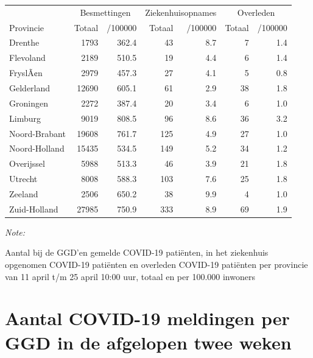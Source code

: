 \documentclass[
  english,
  man,floatsintext]{apa6}
\begin{document}
\begin{table}
\centering
\begin{threeparttable}
\begin{tabular}{lrrrrrr}
\toprule
\multicolumn{1}{c}{ } & \multicolumn{2}{c}{Besmettingen} & \multicolumn{2}{c}{Ziekenhuisopnames} & \multicolumn{2}{c}{Overleden} \\
\cmidrule(l{3pt}r{3pt}){2-3} \cmidrule(l{3pt}r{3pt}){4-5} \cmidrule(l{3pt}r{3pt}){6-7}
Provincie & Totaal & /100000 & Totaal & /100000 & Totaal & /100000\\
\midrule
Drenthe & 1793 & 362.4 & 43 & 8.7 & 7 & 1.4\\
Flevoland & 2189 & 510.5 & 19 & 4.4 & 6 & 1.4\\
FryslÃ¢n & 2979 & 457.3 & 27 & 4.1 & 5 & 0.8\\
Gelderland & 12690 & 605.1 & 61 & 2.9 & 38 & 1.8\\
Groningen & 2272 & 387.4 & 20 & 3.4 & 6 & 1.0\\
Limburg & 9019 & 808.5 & 96 & 8.6 & 36 & 3.2\\
Noord-Brabant & 19608 & 761.7 & 125 & 4.9 & 27 & 1.0\\
Noord-Holland & 15435 & 534.5 & 149 & 5.2 & 34 & 1.2\\
Overijssel & 5988 & 513.3 & 46 & 3.9 & 21 & 1.8\\
Utrecht & 8008 & 588.3 & 103 & 7.6 & 25 & 1.8\\
Zeeland & 2506 & 650.2 & 38 & 9.9 & 4 & 1.0\\
Zuid-Holland & 27985 & 750.9 & 333 & 8.9 & 69 & 1.9\\
\bottomrule
\end{tabular}
\begin{tablenotes}
\item \textit{Note: } 
\item Aantal bij de GGD’en gemelde COVID-19 patiënten, in het ziekenhuis opgenomen COVID-19 patiënten en overleden COVID-19 patiënten per provincie van 11 april t/m 25 april 10:00 uur, totaal en per 100.000 inwoners
\end{tablenotes}
\end{threeparttable}
\end{table}

\newpage

\hypertarget{aantal-covid-19-meldingen-per-ggd-in-de-afgelopen-twee-weken}{%
\section{Aantal COVID-19 meldingen per GGD in de afgelopen twee weken}\label{aantal-covid-19-meldingen-per-ggd-in-de-afgelopen-twee-weken}}
\end{document}
